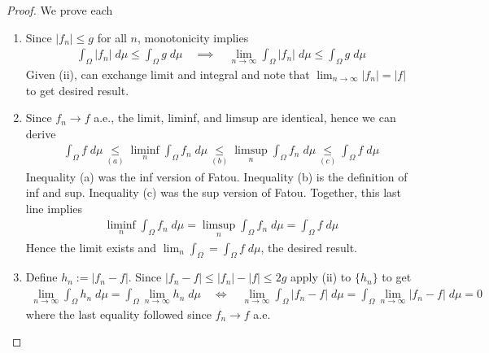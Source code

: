 \documentclass[12pt]{article}
\theoremstyle{plain}
\theoremstyle{definition}
\theoremstyle{remark}
\newcommand{\ra}{\rightarrow}
\newcommand{\limn}{\lim_{n\rightarrow\infty}}
\begin{document}
\begin{proof}
We prove each
\begin{enumerate}[label=(\roman*)]
  \item
    Since $|f_n|\leq g$ for all $n$, monotonicity implies
    \begin{align*}
      \int_\Omega |f_n|\;d\mu
      \leq
      \int_\Omega g\;d\mu
      \quad\implies\quad
      \limn \int_\Omega |f_n|\;d\mu
      \leq
      \int_\Omega g\;d\mu
    \end{align*}
    Given (ii), can exchange limit and integral and note that
    $\limn |f_n|=|f|$ to get desired result.
  \item
    Since $f_n\ra f$ a.e., the limit, liminf, and limsup are identical,
    hence we can derive
    \begin{align*}
      \int_\Omega f \; d\mu
      \underset{(a)}{\leq}
      \liminf_n \int_\Omega f_n \; d\mu
      \underset{(b)}{\leq}
      \limsup_n \int_\Omega f_n \; d\mu
      \underset{(c)}{\leq}
      \int_\Omega f \; d\mu
    \end{align*}
    Inequality (a) was the inf version of Fatou. Inequality (b) is the
    definition of inf and sup. Inequality (c) was the sup version of Fatou.
    Together, this last line implies
    \begin{align*}
      \liminf_n \int_\Omega f_n \; d\mu
      =
      \limsup_n \int_\Omega f_n \; d\mu
      =
      \int_\Omega f \; d\mu
    \end{align*}
    Hence the limit exists and
    $\lim_n \int_\Omega = \int_\Omega f \; d\mu$, the desired result.

  \item Define $h_n:=|f_n-f|$.
    Since $|f_n-f|\leq |f_n|-|f| \leq 2g$
    apply (ii) to $\{h_n\}$ to get
    \begin{align*}
      \limn \int_\Omega h_n\;d\mu
      = \int_\Omega \limn h_n\;d\mu
      \quad\iff\quad
      \limn \int_\Omega |f_n-f|\;d\mu
      = \int_\Omega \limn |f_n-f|\;d\mu
      = 0
    \end{align*}
    where the last equality followed since $f_n\ra f$ a.e.
\end{enumerate}
\end{proof}
\end{document}
